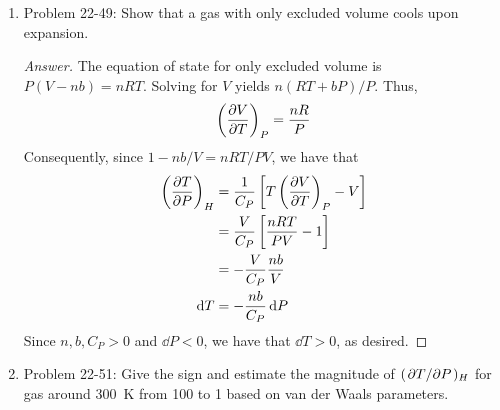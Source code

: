 \documentclass[../psets.tex]{subfiles}
\begin{document}
\begin{enumerate}
\begin{enumerate}
\begin{proof}[Answer]
\begin{equation*}
                = -\pdv{T}\left( \pdv{G}{P} \right)_T
                = -\left( \pdv{V}{T} \right)_P
            \end{equation*}
            that
            \begin{align*}
                \left( \pdv{G}{P} \right)_T &= \left( \pdv{H}{P} \right)_T+T\left( \pdv{V}{T} \right)_P\\
                V &= \left( \pdv{H}{P} \right)_T+T\left( \pdv{V}{T} \right)_P\\
                \left( \pdv{H}{P} \right)_T &= V-T\left( \pdv{V}{T} \right)_P
            \end{align*}
            Therefore, from part (d),
            \begin{align*}
                \left( \pdv{T}{P} \right)_H &= -\frac{1}{C_P}\left( \pdv{H}{P} \right)_T\\
                &= -\frac{1}{C_P}\left[ V-T\left( \pdv{V}{T} \right)_P \right]\\
                &= \frac{1}{C_P}\left[ T\left( \pdv{V}{T} \right)_P-V \right]\\
                &= \frac{V}{C_P}(\alpha T-1)
            \end{align*}
        \end{proof}
        \item Problem 22-49: Show that a gas with only excluded volume cools upon expansion.
        \begin{proof}[Answer]
            The equation of state for only excluded volume is $P(V-nb)=nRT$. Solving for $V$ yields $n(RT+bP)/P$. Thus,
            \begin{equation*}
                \left( \pdv{V}{T} \right)_P = \frac{nR}{P}
            \end{equation*}
            Consequently, since $1-nb/V=nRT/PV$, we have that
            \begin{align*}
                \left( \pdv{T}{P} \right)_H &= \frac{1}{C_P}\left[ T\left( \pdv{V}{T} \right)_P-V \right]\\
                &= \frac{V}{C_P}\left[ \frac{nRT}{PV}-1 \right]\\
                &= -\frac{V}{C_P}\frac{nb}{V}\\
                \dd{T} &= -\frac{nb}{C_P}\dd{P}
            \end{align*}
            Since $n,b,C_P>0$ and $\dd{P}<0$, we have that $\dd{T}>0$, as desired.
        \end{proof}
        \item Problem 22-51: Give the sign and estimate the magnitude of $(\pdv*{T}{P})_H$ for  gas around \SI{300}{\kelvin} from \SI{100}{\atmosphere} to \SI{1}{\atmosphere} based on van der Waals parameters.

\end{enumerate}
\end{enumerate}
\end{document}
